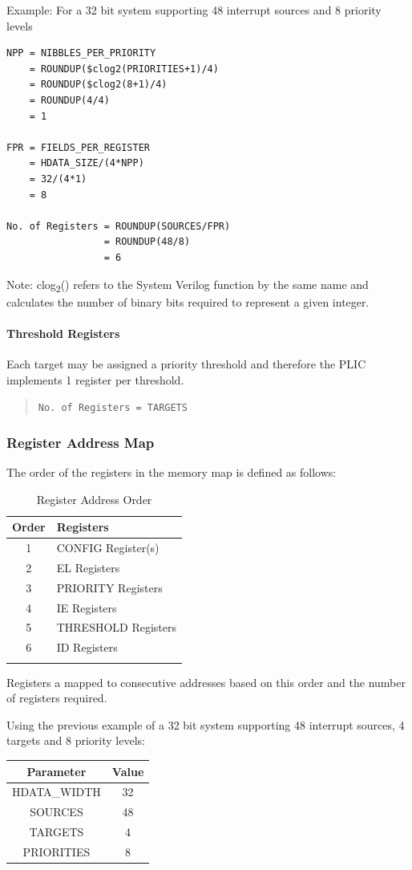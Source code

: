 \documentclass[]{article}
\begin{document}
Example: For a 32 bit system supporting 48 interrupt sources and 8
priority levels

\begin{verbatim}
NPP = NIBBLES_PER_PRIORITY
    = ROUNDUP($clog2(PRIORITIES+1)/4)
    = ROUNDUP($clog2(8+1)/4)
    = ROUNDUP(4/4)
    = 1

FPR = FIELDS_PER_REGISTER
    = HDATA_SIZE/(4*NPP)
    = 32/(4*1)
    = 8

No. of Registers = ROUNDUP(SOURCES/FPR)
                 = ROUNDUP(48/8)
                 = 6
\end{verbatim}

Note: clog\textsubscript{2}() refers to the System Verilog function by
the same name and calculates the number of binary bits required to
represent a given integer.

\paragraph{Threshold Registers}

Each target may be assigned a priority threshold and therefore the PLIC
implements 1 register per threshold.

\begin{quote}
\texttt{No.\ of\ Registers\ =\ TARGETS}
\end{quote}

\subsubsection{Register Address Map}

The order of the registers in the memory map is defined as follows:

\begin{longtable}[]{@{}cl@{}}
\toprule
\textbf{Order} & \textbf{Registers}\tabularnewline
\midrule
\endhead
1 & CONFIG Register(s)\tabularnewline
2 & EL Registers\tabularnewline
3 & PRIORITY Registers\tabularnewline
4 & IE Registers\tabularnewline
5 & THRESHOLD Registers\tabularnewline
6 & ID Registers\tabularnewline
\bottomrule
\caption{Register Address Order}
\label{tab:REGMAP}
\end{longtable}

Registers a mapped to consecutive addresses based on this order and the
number of registers required.

Using the previous example of a 32 bit system supporting 48 interrupt
sources, 4 targets and 8 priority levels:

\begin{longtable}[]{@{}cc@{}}
\toprule
\textbf{Parameter} & \textbf{Value}\tabularnewline
\midrule
\endhead
HDATA\_WIDTH & 32\tabularnewline
SOURCES & 48\tabularnewline
TARGETS & 4\tabularnewline
PRIORITIES & 8\tabularnewline
\bottomrule
\end{longtable}
\end{document}
